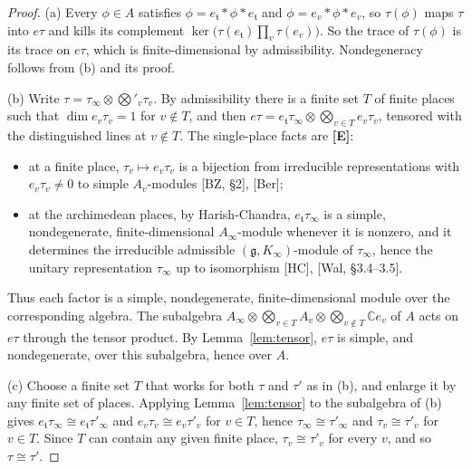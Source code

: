 \documentclass[12pt]{article}
\newcommand{\C}{\mathbb{C}}
\newcommand{\Ev}{\textbf{[E]}}
\theoremstyle{plain}
\theoremstyle{definition}
\begin{document}
\begin{proof}
(a) Every $\phi\in A$ satisfies $\phi=e_{\mathfrak t}*\phi*e_{\mathfrak t}$ and $\phi=e_v*\phi*e_v$, so $\tau(\phi)$ maps $\tau$ into $e\tau$ and kills its complement $\ker\big(\tau(e_{\mathfrak t})\prod_v\tau(e_v)\big)$. So the trace of $\tau(\phi)$ is its trace on $e\tau$, which is finite-dimensional by admissibility. Nondegeneracy follows from (b) and its proof.

(b) Write $\tau=\tau_\infty\otimes\bigotimes'_v\tau_v$. By admissibility there is a finite set $T$ of finite places such that $\dim e_v\tau_v=1$ for $v\notin T$, and then $e\tau=e_{\mathfrak t}\tau_\infty\otimes\bigotimes_{v\in T}e_v\tau_v$, tensored with the distinguished lines at $v\notin T$. The single-place facts are \Ev:
\begin{itemize}
\item at a finite place, $\tau_v\mapsto e_v\tau_v$ is a bijection from irreducible representations with $e_v\tau_v\ne0$ to simple $A_v$-modules [BZ, \S2], [Ber];
\item at the archimedean places, by Harish-Chandra, $e_{\mathfrak t}\tau_\infty$ is a simple, nondegenerate, finite-dimensional $A_\infty$-module whenever it is nonzero, and it determines the irreducible admissible $(\mathfrak g,K_\infty)$-module of $\tau_\infty$, hence the unitary representation $\tau_\infty$ up to isomorphism [HC], [Wal, \S3.4--3.5].
\end{itemize}
Thus each factor is a simple, nondegenerate, finite-dimensional module over the corresponding algebra. The subalgebra $A_\infty\otimes\bigotimes_{v\in T}A_v\otimes\bigotimes_{v\notin T}\C e_v$ of $A$ acts on $e\tau$ through the tensor product. By Lemma~\ref{lem:tensor}, $e\tau$ is simple, and nondegenerate, over this subalgebra, hence over $A$.

(c) Choose a finite set $T$ that works for both $\tau$ and $\tau'$ as in (b), and enlarge it by any finite set of places. Applying Lemma~\ref{lem:tensor} to the subalgebra of (b) gives $e_{\mathfrak t}\tau_\infty\cong e_{\mathfrak t}\tau'_\infty$ and $e_v\tau_v\cong e_v\tau'_v$ for $v\in T$, hence $\tau_\infty\cong\tau'_\infty$ and $\tau_v\cong\tau'_v$ for $v\in T$. Since $T$ can contain any given finite place, $\tau_v\cong\tau'_v$ for every $v$, and so $\tau\cong\tau'$.
\end{proof}
\end{document}
